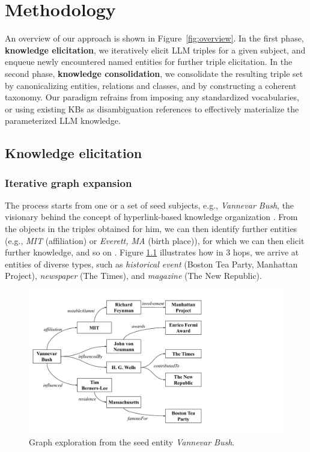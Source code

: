 \chapter{Methodology}

An overview of our approach is shown in Figure~\ref{fig:overview}. In the first phase, \textbf{knowledge elicitation}, we iteratively elicit LLM triples for a given subject, and enqueue newly encountered named entities for further triple elicitation. In the second phase, \textbf{knowledge consolidation}, we consolidate the resulting triple set by canonicalizing entities, relations and classes, and by constructing a coherent taxonomy. 
Our paradigm refrains from imposing any standardized vocabularies, or using existing KBs as disambiguation references to effectively materialize the parameterized LLM knowledge.

\section{Knowledge elicitation}

\subsection{Iterative graph expansion}
The process starts from one or a set of seed subjects, e.g., \textit{Vannevar Bush}, the visionary behind the concept of hyperlink-based knowledge organization \cite{bush1945we}. From the objects in the triples obtained for him, we can then identify further entities (e.g., \textit{MIT} (affiliation) or \textit{Everett, MA} (birth place)), for which we can then elicit further knowledge, and so on \cite{brin1998extracting}. Figure \ref{fig:graph_explore} illustrates how in 3 hops, we arrive at entities of diverse types, such as \textit{historical event} (Boston Tea Party, Manhattan Project), \textit{newspaper} (The Times), and \textit{magazine} (The New Republic).


\begin{figure}[t]
    \centering
    \includegraphics[width=\columnwidth]{figures/graph-explore-2.pdf}
    \caption{Graph exploration from the seed entity \textit{Vannevar Bush}.}
    \label{fig:graph_explore}
\end{figure}



